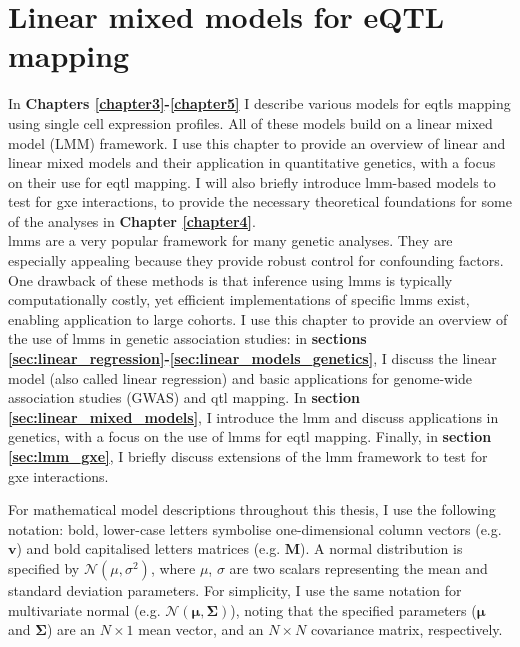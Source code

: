 
\chapter{Linear mixed models for eQTL mapping}
\label{chapter2}

In \textbf{Chapters \ref{chapter3}-\ref{chapter5}} I describe various models for \glspl{eqtl} mapping using single cell expression profiles. 
All of these models build on a linear mixed model (LMM) framework. 
I use this chapter to provide an overview of linear and linear mixed models and their application in quantitative genetics, with a focus on their use for \gls{eqtl} mapping. 
I will also briefly introduce \gls{lmm}-based models to test for \gls{gxe} interactions, to provide the necessary theoretical foundations for some of the analyses in \textbf{Chapter \ref{chapter4}}. \\

\gls{lmm}s are a very popular framework for many genetic analyses. 
They are especially appealing because they provide robust control for confounding factors. 
One drawback of these methods is that inference using \gls{lmm}s is typically computationally costly, yet efficient implementations of specific \gls{lmm}s exist, enabling application to large cohorts. 
I use this chapter to provide an overview of the use of \gls{lmm}s in genetic association studies: in \textbf{sections \ref{sec:linear_regression}-\ref{sec:linear_models_genetics}}, I discuss the linear model (also called linear regression) and basic applications for genome-wide association studies (GWAS) and \gls{qtl} mapping. 
In \textbf{section \ref{sec:linear_mixed_models}}, I introduce the \gls{lmm} and discuss applications in genetics, with a focus on the use of \gls{lmm}s for \gls{eqtl} mapping. 
Finally, in \textbf{section \ref{sec:lmm_gxe}}, I briefly discuss extensions of the \gls{lmm} framework to test for \gls{gxe} interactions.\\

\newpage

For mathematical model descriptions throughout this thesis, I use the following notation: bold, lower-case letters symbolise one-dimensional column vectors (e.g. $\mathbf{v}$) and bold capitalised letters matrices (e.g. $\mathbf{M}$). 
A normal distribution is specified by $ \mathcal{N}(\mu, \sigma^2)$, where $\mu$, $\sigma$ are two scalars representing the mean and standard deviation parameters.
For simplicity, I use the same notation for multivariate normal (e.g. $ \mathcal{N}(\boldsymbol{\mu}, \boldsymbol{\Sigma})$), noting that the specified parameters ($\boldsymbol{\mu}$ and $\boldsymbol{\Sigma}$) are an $N \times 1$ mean vector, and an $N \times N$ covariance matrix, respectively.


